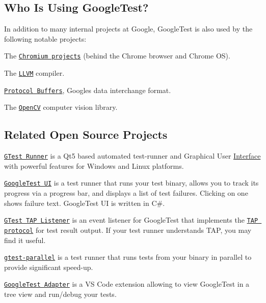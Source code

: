 \subsection*{Who Is Using Google\+Test?}

In addition to many internal projects at Google, Google\+Test is also used by the following notable projects\+:


\begin{DoxyItemize}
\item The \href{https://www.chromium.org/}{\tt Chromium projects} (behind the Chrome browser and Chrome OS).
\item The \href{https://llvm.org/}{\tt L\+L\+VM} compiler.
\item \href{https://github.com/google/protobuf}{\tt Protocol Buffers}, Google\textquotesingle{}s data interchange format.
\item The \href{https://opencv.org/}{\tt Open\+CV} computer vision library.
\end{DoxyItemize}

\subsection*{Related Open Source Projects}

\href{https://github.com/nholthaus/gtest-runner}{\tt G\+Test Runner} is a Qt5 based automated test-\/runner and Graphical User \mbox{\hyperlink{classInterface}{Interface}} with powerful features for Windows and Linux platforms.

\href{https://github.com/ospector/gtest-gbar}{\tt Google\+Test UI} is a test runner that runs your test binary, allows you to track its progress via a progress bar, and displays a list of test failures. Clicking on one shows failure text. Google\+Test UI is written in C\#.

\href{https://github.com/kinow/gtest-tap-listener}{\tt G\+Test T\+AP Listener} is an event listener for Google\+Test that implements the \href{https://en.wikipedia.org/wiki/Test_Anything_Protocol}{\tt T\+AP protocol} for test result output. If your test runner understands T\+AP, you may find it useful.

\href{https://github.com/google/gtest-parallel}{\tt gtest-\/parallel} is a test runner that runs tests from your binary in parallel to provide significant speed-\/up.

\href{https://marketplace.visualstudio.com/items?itemName=DavidSchuldenfrei.gtest-adapter}{\tt Google\+Test Adapter} is a VS Code extension allowing to view Google\+Test in a tree view and run/debug your tests.

